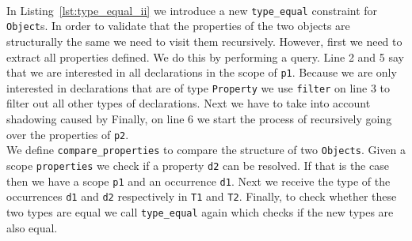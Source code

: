 \documentclass{article}
\newcommand{\ttt}[1]{\texttt{#1}}
\begin{document}
\begin{center}
    \begin{minipage}{.75\textwidth}
    
    \end{minipage}
\end{center}
\\
\noindent
In Listing~\ref{lst:type_equal_ii} we introduce a new \ttt{type\_equal} constraint for \ttt{Object}s.
In order to validate that the properties of the two objects are structurally the same we need to visit them recursively.
However, first we need to extract all properties defined.
We do this by performing a query.
Line 2 and 5 say that we are interested in all declarations in the scope of \ttt{p1}.
Because we are only interested in declarations that are of type \ttt{Property} we use \ttt{filter} on line 3 to filter out all other types of declarations.
Next we have to take into account shadowing caused by 
Finally, on line 6 we start the process of recursively going over the properties of \ttt{p2}.
\\
\noindent
We define \ttt{compare\_properties} to compare the structure of two \ttt{Objects}.
Given a scope \ttt{properties} we check if a property \ttt{d2} can be resolved.
If that is the case then we have a scope \ttt{p1} and an occurrence \ttt{d1}.
Next we receive the type of the occurrences \ttt{d1} and \ttt{d2} respectively in \ttt{T1} and \ttt{T2}.
Finally, to check whether these two types are equal we call \ttt{type\_equal} again which checks if the new types are also equal.



\end{document}
